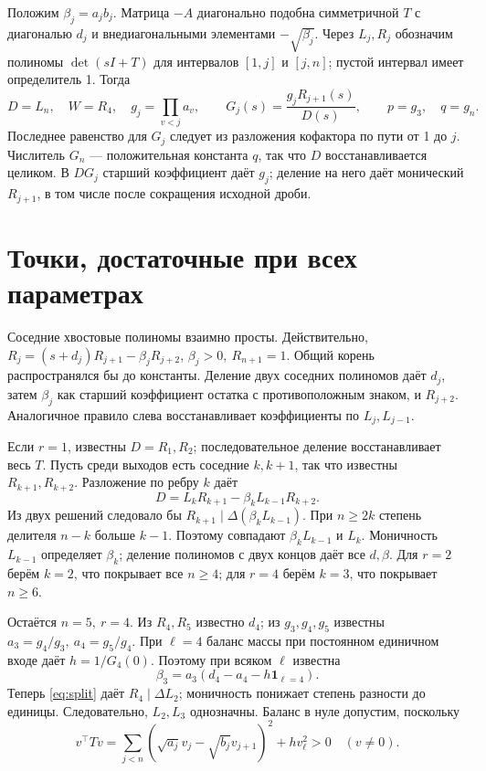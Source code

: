 \documentclass[11pt,a4paper]{article}
\begin{document}
Положим \(\beta_j=a_jb_j\). Матрица \(-A\) диагонально подобна симметричной \(T\) с диагональю \(d_j\) и внедиагональными элементами \(-\sqrt{\beta_j}\).
Через \(L_j,R_j\) обозначим полиномы \(\det(sI+T)\) для интервалов \([1,j]\) и \([j,n]\); пустой интервал имеет определитель 1. Тогда
\[
 D=L_n,\quad W=R_4,\quad g_j=\prod_{v<j}a_v,\qquad
 G_j(s)=\frac{g_jR_{j+1}(s)}{D(s)},\qquad p=g_3,\quad q=g_n .
\]
Последнее равенство для \(G_j\) следует из разложения кофактора по пути от 1 до \(j\). Числитель \(G_n\) --- положительная константа \(q\), так что \(D\) восстанавливается целиком. В \(D G_j\) старший коэффициент даёт \(g_j\); деление на него даёт монический \(R_{j+1}\), в том числе после сокращения исходной дроби.

\newpage
\section{Точки, достаточные при всех параметрах}
Соседние хвостовые полиномы взаимно просты. Действительно,
\(R_j=(s+d_j)R_{j+1}-\beta_jR_{j+2}\), \(\beta_j>0,\ R_{n+1}=1\). Общий корень распространялся бы до константы. Деление двух соседних полиномов даёт \(d_j\), затем \(\beta_j\) как старший коэффициент остатка с противоположным знаком, и \(R_{j+2}\). Аналогичное правило слева восстанавливает коэффициенты по \(L_j,L_{j-1}\).

Если \(r=1\), известны \(D=R_1,R_2\); последовательное деление восстанавливает весь \(T\). Пусть среди выходов есть соседние \(k,k+1\), так что известны \(R_{k+1},R_{k+2}\). Разложение по ребру \(k\) даёт
\begin{equation}\label{eq:split}
D=L_kR_{k+1}-\beta_k L_{k-1}R_{k+2}.
\end{equation}
Из двух решений следовало бы \(R_{k+1}\mid\Delta(\beta_k L_{k-1})\). При \(n\ge2k\) степень делителя \(n-k\) больше \(k-1\). Поэтому совпадают \(\beta_k L_{k-1}\) и \(L_k\). Моничность \(L_{k-1}\) определяет \(\beta_k\); деление полиномов с двух концов даёт все \(d,\beta\). Для \(r=2\) берём \(k=2\), что покрывает все \(n\ge4\); для \(r=4\) берём \(k=3\), что покрывает \(n\ge6\).

Остаётся \(n=5,\ r=4\). Из \(R_4,R_5\) известно \(d_4\); из \(g_3,g_4,g_5\) известны \(a_3=g_4/g_3,\ a_4=g_5/g_4\). При \(\ell=4\) баланс массы при постоянном единичном входе даёт \(h=1/G_4(0)\). Поэтому при всяком \(\ell\) известна
\[
 \beta_3=a_3(d_4-a_4-h\mathbf1_{\ell=4}).
\]
Теперь \eqref{eq:split} даёт \(R_4\mid\Delta L_2\); моничность понижает степень разности до единицы. Следовательно, \(L_2,L_3\) однозначны. Баланс в нуле допустим, поскольку
\[
 v^\top Tv=\sum_{j<n}(\sqrt{a_j}v_j-\sqrt{b_j}v_{j+1})^2+h v_\ell^2>0
 \quad(v\ne0).
\]
\end{document}

